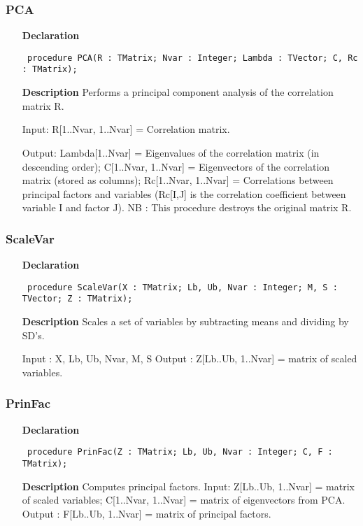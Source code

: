 \documentclass[12pt,a4paper,oneside]{report}
\newcommand{\declarationitem}[1]{\textbf{#1}}
\newcommand{\descriptiontitle}[1]{\textbf{#1}}
\newcommand{\code}[1]{\texttt{#1}}
\begin{document}
\subsubsection{PCA}
\label{upca-PCA}
\begin{itemize}\item[\declarationitem{Declaration}\hfill]
	\begin{flushleft}
		\code{
			procedure PCA(R : TMatrix; Nvar : Integer; Lambda : TVector; C, Rc : TMatrix);}
	\end{flushleft}
	\item[\descriptiontitle{Description}]
	Performs a principal component analysis of the correlation matrix R.
	
	Input: R[1..Nvar, 1..Nvar] = Correlation matrix. 
	
	Output: Lambda[1..Nvar] = Eigenvalues of the correlation matrix (in descending order); C[1..Nvar, 1..Nvar] = Eigenvectors of the correlation matrix (stored as columns); Rc[1..Nvar, 1..Nvar] = Correlations between principal factors and variables (Rc[I,J] is the correlation coefficient between variable I and factor J). NB : This procedure destroys the original matrix R.
	
\end{itemize}
\subsubsection{ScaleVar}
\label{upca-ScaleVar}
\begin{itemize}\item[\declarationitem{Declaration}\hfill]
	\begin{flushleft}
		\code{
			procedure ScaleVar(X : TMatrix; Lb, Ub, Nvar : Integer; M, S : TVector; Z : TMatrix);}
	\end{flushleft}
	\item[\descriptiontitle{Description}]
	Scales a set of variables by subtracting means and dividing by SD's.
	
	Input : X, Lb, Ub, Nvar, M, S Output : Z[Lb..Ub, 1..Nvar] = matrix of scaled variables.
	
\end{itemize}
\subsubsection{PrinFac}
\label{upca-PrinFac}
\begin{itemize}\item[\declarationitem{Declaration}\hfill]
	\begin{flushleft}
		\code{
			procedure PrinFac(Z : TMatrix; Lb, Ub, Nvar : Integer; C, F : TMatrix);}
	\end{flushleft}
	\item[\descriptiontitle{Description}]
	Computes principal factors. Input: Z[Lb..Ub, 1..Nvar] = matrix of scaled variables; C[1..Nvar, 1..Nvar] = matrix of eigenvectors from PCA. Output : F[Lb..Ub, 1..Nvar] = matrix of principal factors.
\end{itemize}
\end{document}
